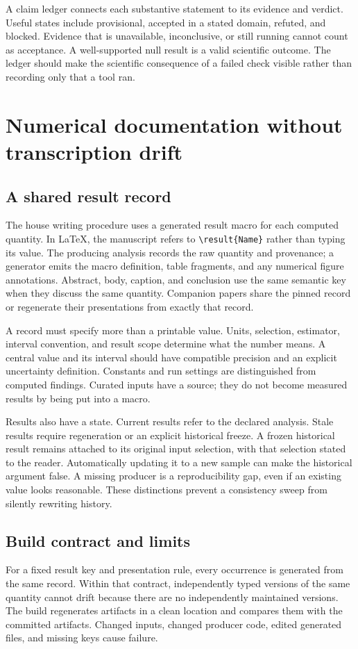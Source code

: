 \documentclass{article}
\begin{document}
A claim ledger connects each substantive statement to its evidence and verdict. Useful states include provisional, accepted in a stated domain, refuted, and blocked. Evidence that is unavailable, inconclusive, or still running cannot count as acceptance. A well-supported null result is a valid scientific outcome. The ledger should make the scientific consequence of a failed check visible rather than recording only that a tool ran.

\section{Numerical documentation without transcription drift}
\subsection{A shared result record}
The house writing procedure uses a generated result macro for each computed quantity. In LaTeX, the manuscript refers to \verb|\result{Name}| rather than typing its value. The producing analysis records the raw quantity and provenance; a generator emits the macro definition, table fragments, and any numerical figure annotations. Abstract, body, caption, and conclusion use the same semantic key when they discuss the same quantity. Companion papers share the pinned record or regenerate their presentations from exactly that record.

A record must specify more than a printable value. Units, selection, estimator, interval convention, and result scope determine what the number means. A central value and its interval should have compatible precision and an explicit uncertainty definition. Constants and run settings are distinguished from computed findings. Curated inputs have a source; they do not become measured results by being put into a macro.

Results also have a state. Current results refer to the declared analysis. Stale results require regeneration or an explicit historical freeze. A frozen historical result remains attached to its original input selection, with that selection stated to the reader. Automatically updating it to a new sample can make the historical argument false. A missing producer is a reproducibility gap, even if an existing value looks reasonable. These distinctions prevent a consistency sweep from silently rewriting history.

\subsection{Build contract and limits}
For a fixed result key and presentation rule, every occurrence is generated from the same record. Within that contract, independently typed versions of the same quantity cannot drift because there are no independently maintained versions. The build regenerates artifacts in a clean location and compares them with the committed artifacts. Changed inputs, changed producer code, edited generated files, and missing keys cause failure.
\end{document}
